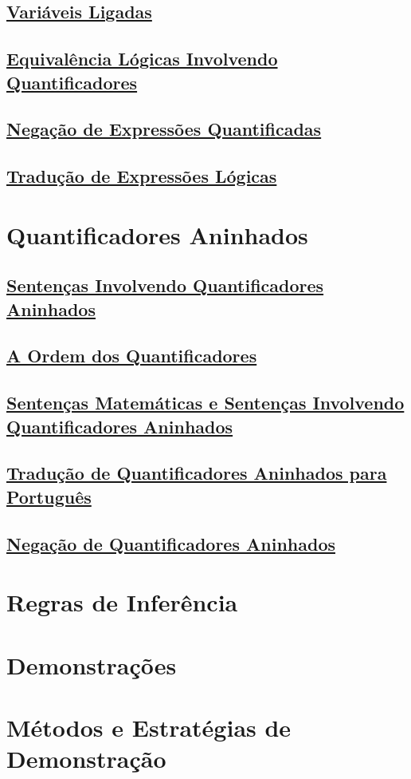 \subsection*{\underline{Variáveis Ligadas}}
\subsection*{\underline{Equivalência Lógicas Involvendo Quantificadores}}
\subsection*{\underline{Negação de Expressões Quantificadas}}
\subsection*{\underline{Tradução de Expressões Lógicas}}

\section{Quantificadores Aninhados}

\subsection*{\underline{Sentenças Involvendo Quantificadores Aninhados}}
\subsection*{\underline{A Ordem dos Quantificadores}}
\subsection*{\underline{Sentenças Matemáticas e Sentenças Involvendo Quantificadores
Aninhados}}
\subsection*{\underline{Tradução de Quantificadores Aninhados para Português}}
\subsection*{\underline{Negação de Quantificadores Aninhados}}

\section{Regras de Inferência}
\section{Demonstrações}
\section{Métodos e Estratégias de Demonstração}